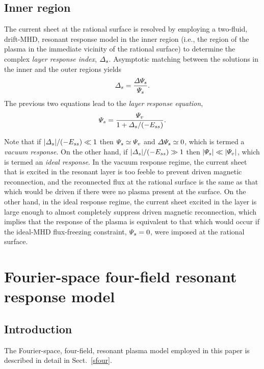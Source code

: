 \documentclass[12pt,prb,aps]{revtex4-1}
\begin{document}
\subsection{Inner region}
The current sheet at the rational surface is resolved by employing a two-fluid, drift-MHD, resonant response model
in the  inner region (i.e., the region of the plasma in the immediate vicinity of the rational surface) to determine the
complex {\em layer response index}, ${\mit\Delta}_s$. Asymptotic matching between the solutions in the inner and the outer regions
yields
\begin{equation}\label{e4g}
{\mit\Delta}_s= \frac{{\mit\Delta\Psi}_{\!s}}{{\mit\Psi}_s}.
\end{equation}
The previous two equations lead to the {\em layer response equation}, 
\begin{equation}\label{response}
{\mit\Psi}_s = \frac{{\mit\Psi}_v}{1+{\mit\Delta}_s/(-E_{ss})}.
\end{equation}

Note that if $|{\mit\Delta}_s|/(-E_{ss})\ll 1$ then ${\mit\Psi}_s\simeq {\mit\Psi}_v$ and ${\mit\Delta\Psi}_{\!s}\simeq 0$, 
which is termed a {\em vacuum response}. On the other hand, if $|{\mit\Delta}_s|/(-E_{ss})\gg 1$ then $|{\mit\Psi}_s|\ll |{\mit\Psi}_v|$,
which is termed an {\em ideal response}. In the vacuum response regime, the current sheet that is excited in the resonant layer is too feeble
to prevent driven magnetic reconnection, and the reconnected flux at the rational surface is the same as that which would
be driven if there were no plasma present at the surface. On the other hand, in the ideal response regime, the  current sheet excited in the layer is
large enough to almost completely suppress driven magnetic reconnection, which implies that the response of the plasma is equivalent
to that which would occur if the ideal-MHD flux-freezing constraint, ${\mit\Psi}_s=0$, were imposed at the rational surface.\cite{rf2025}

\section{Fourier-space four-field resonant response model}\label{sect3}
\subsection{Introduction}
The Fourier-space,  four-field, resonant plasma model employed in this paper is described in detail in Sect.~\ref{sfour}. 
\end{document}
